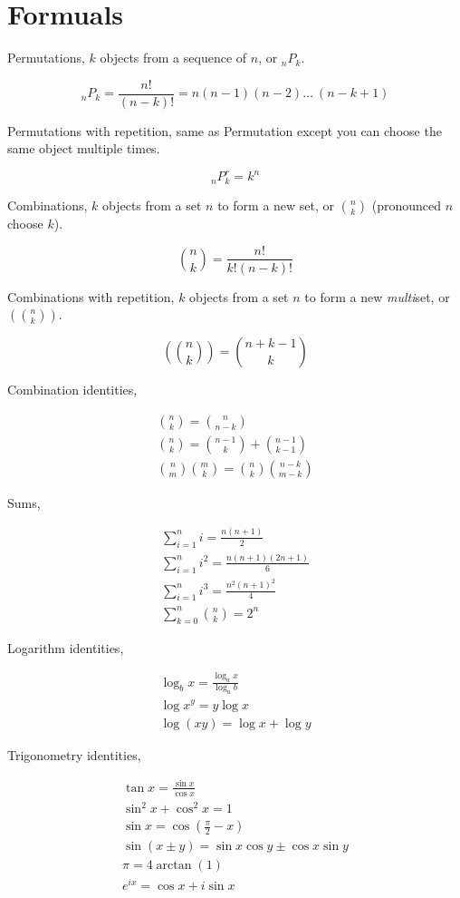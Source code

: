 \documentclass{article}
\begin{document}
\section{Formuals}

Permutations, $k$ objects from a sequence of $n$, or $_{n}P_{k}$.

\begin{equation}
   _{n}P_{k} = \frac{n!}{(n - k)!} = n(n-1)(n-2)\ldots\ (n-k+1)
\end{equation}

Permutations with repetition, same as Permutation except you can choose the same object multiple times.

\begin{equation}
   _{n}P^r_{k} = k^n
\end{equation}

Combinations, $k$ objects from a set $n$ to form a new set, or $\binom{n}{k}$ (pronounced $n$ choose $k$).

\begin{equation}
   \binom{n}{k} = \frac{n!}{k!(n-k)!}
\end{equation}

Combinations with repetition, $k$ objects from a set $n$ to form a new \textit{multi}set, or $\left(\binom{n}{k}\right)$.

\begin{equation}
   \left(\binom{n}{k}\right) = \binom{n + k - 1}{k}
\end{equation}

Combination identities,

\begin{gather}
   \binom{n}{k} = \binom{n}{n - k} \\
   \binom{n}{k} = \binom{n - 1}{k} + \binom{n - 1}{k - 1} \\
   \binom{n}{m} \binom{m}{k} = \binom{n}{k} \binom{n - k}{m - k}
\end{gather}

Sums,

\begin{gather}
   \sum^n_{i=1} i = \frac{n(n+1)}{2} \\
   \sum^n_{i=1} i^2 = \frac{n(n+1)(2n+1)}{6} \\
   \sum^n_{i=1} i^3 = \frac{n^2(n+1)^2}{4} \\
   \sum^n_{k=0} \binom{n}{k} = 2^n
\end{gather}

Logarithm identities,

\begin{gather}
   \log_b x = \frac{\log_a x}{\log_a b} \\
   \log x^y = y \log x \\
   \log(xy) = \log x + \log y
\end{gather}

Trigonometry identities,

\begin{gather}
   \tan x = \frac{\sin x}{\cos x} \\
   \sin^2 x + \cos^2 x = 1 \\
   \sin x = \cos (\frac{\pi}{2} - x) \\
   \sin (x \pm y) = \sin x \cos y \pm \cos x \sin y \\
   \pi = 4 \arctan(1) \\
   e^{ix} = \cos x + i \sin x
\end{gather}
\end{document}
